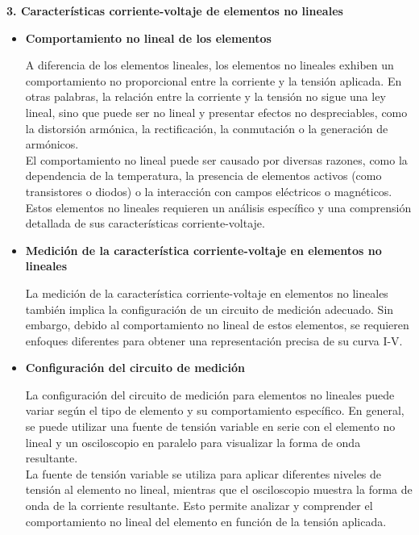 \documentclass[12pt]{article}
\begin{document}
	\textbf{3. Características corriente-voltaje de elementos no lineales}
	
	\begin{itemize}
		\item \textbf{Comportamiento no lineal de los elementos}
		
		A diferencia de los elementos lineales, los elementos no lineales exhiben un comportamiento no proporcional entre la corriente y la tensión aplicada. En otras palabras, la relación entre la corriente y la tensión no sigue una ley lineal, sino que puede ser no lineal y presentar efectos no despreciables, como la distorsión armónica, la rectificación, la conmutación o la generación de armónicos.\\
		
		El comportamiento no lineal puede ser causado por diversas razones, como la dependencia de la temperatura, la presencia de elementos activos (como transistores o diodos) o la interacción con campos eléctricos o magnéticos. Estos elementos no lineales requieren un análisis específico y una comprensión detallada de sus características corriente-voltaje.
		
		\item \textbf{Medición de la característica corriente-voltaje en elementos no lineales}
		
		La medición de la característica corriente-voltaje en elementos no lineales también implica la configuración de un circuito de medición adecuado. Sin embargo, debido al comportamiento no lineal de estos elementos, se requieren enfoques diferentes para obtener una representación precisa de su curva I-V.
		
		\item \textbf{Configuración del circuito de medición}
		
		La configuración del circuito de medición para elementos no lineales puede variar según el tipo de elemento y su comportamiento específico. En general, se puede utilizar una fuente de tensión variable en serie con el elemento no lineal y un osciloscopio en paralelo para visualizar la forma de onda resultante.\\
		
		La fuente de tensión variable se utiliza para aplicar diferentes niveles de tensión al elemento no lineal, mientras que el osciloscopio muestra la forma de onda de la corriente resultante. Esto permite analizar y comprender el comportamiento no lineal del elemento en función de la tensión aplicada.
	\end{itemize}
	
\end{document}
